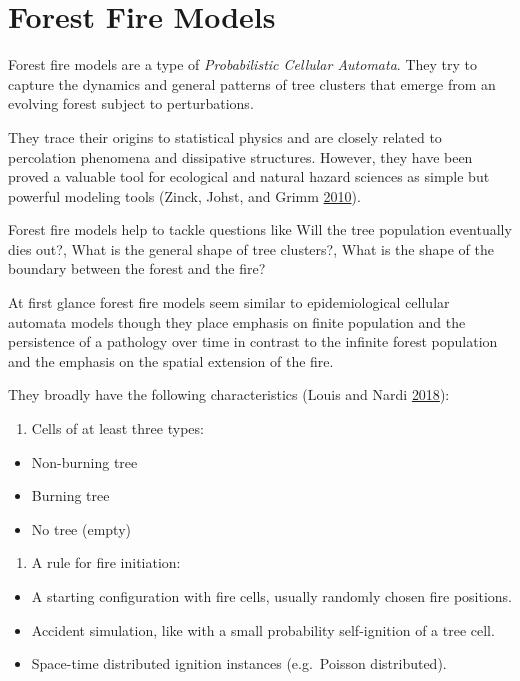 \documentclass[
  12pt,
  openany]{book}
\providecommand{\tightlist}{%
  \setlength{\itemsep}{0pt}\setlength{\parskip}{0pt}}
\begin{document}
\hypertarget{forest-fire-models}{%
\section{Forest Fire Models}\label{forest-fire-models}}

Forest fire models are a type of \emph{Probabilistic Cellular Automata}. They try to capture the dynamics and general patterns of tree clusters that emerge from an evolving forest subject to perturbations.

They trace their origins to statistical physics and are closely related to percolation phenomena and dissipative structures. However, they have been proved a valuable tool for ecological and natural hazard sciences as simple but powerful modeling tools (Zinck, Johst, and Grimm \protect\hyperlink{ref-zinck2010wildfire}{2010}).

Forest fire models help to tackle questions like Will the tree population eventually dies out?, What is the general shape of tree clusters?, What is the shape of the boundary between the forest and the fire?

At first glance forest fire models seem similar to epidemiological cellular automata models though they place emphasis on finite population and the persistence of a pathology over time in contrast to the infinite forest population and the emphasis on the spatial extension of the fire.

They broadly have the following characteristics (Louis and Nardi \protect\hyperlink{ref-louis2018probabilistic}{2018}):

\begin{enumerate}
\def\labelenumi{\arabic{enumi}.}
\tightlist
\item
  Cells of at least three types:
\end{enumerate}

\begin{itemize}
\tightlist
\item
  Non-burning tree
\item
  Burning tree
\item
  No tree (empty)
\end{itemize}

\begin{enumerate}
\def\labelenumi{\arabic{enumi}.}
\setcounter{enumi}{1}
\tightlist
\item
  A rule for fire initiation:
\end{enumerate}

\begin{itemize}
\tightlist
\item
  A starting configuration with fire cells, usually randomly chosen fire positions.
\item
  Accident simulation, like with a small probability self-ignition of a tree cell.
\item
  Space-time distributed ignition instances (e.g.~Poisson distributed).
\end{itemize}
\end{document}

